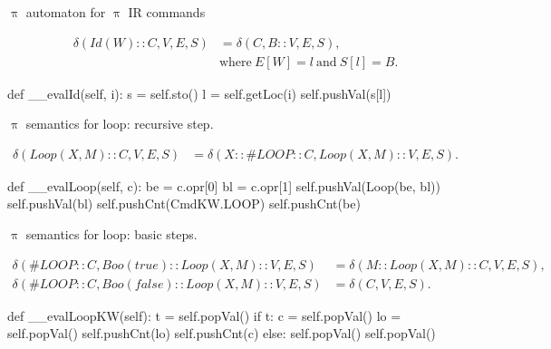 \documentclass{beamer}
\begin{document}
\begin{frame}{{\color{red}$\uppi$ automaton} for {\color{red}$\uppi$ IR} commands}
\begin{scriptsize}
\begin{align}
\delta(Id(W) :: C, V, E, S) & = \delta(C, B :: V, E, S), \nonumber \\ & \text{where}~ E[W] = l ~\text{and}~ S[l] = B. \nonumber 
\end{align}
\end{scriptsize}
        
\begin{python}
    def __evalId(self, i):
        s = self.sto()
        l = self.getLoc(i)
        self.pushVal(s[l])
\end{python}

\framebreak
       
{\color{red}$\uppi$}  semantics for loop: recursive step.

\begin{scriptsize}
\begin{align}
\delta(Loop(X, M) :: C, V, E, S) & = \delta(X :: \#LOOP :: C, Loop(X, M) :: V, E, S). \nonumber 
\end{align}
\end{scriptsize}
       
\begin{python}
    def __evalLoop(self, c):
        be = c.opr[0]
        bl = c.opr[1]
        self.pushVal(Loop(be, bl))
        self.pushVal(bl)
        self.pushCnt(CmdKW.LOOP)
        self.pushCnt(be)
\end{python}

\framebreak
       
{\color{red}$\uppi$}  semantics for loop: basic steps.

\begin{scriptsize}
\begin{align}
\delta(\#LOOP :: C, Boo(true) :: Loop(X, M) :: V, E, S) & = \delta(M :: Loop(X, M) :: C, V, E, S), \nonumber \\
\delta(\#LOOP :: C, Boo(false) :: Loop(X, M) :: V, E, S) & = \delta(C, V, E, S). \nonumber
\end{align}
\end{scriptsize}
       
\begin{python}
    def __evalLoopKW(self):
        t = self.popVal()
        if t:
            c = self.popVal()
            lo = self.popVal()
            self.pushCnt(lo)
            self.pushCnt(c)
        else:
            self.popVal()
            self.popVal()
\end{python}


\end{frame}
\end{document}
